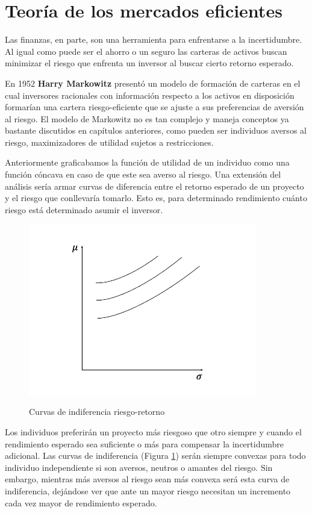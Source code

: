 \section{Teoría de los mercados eficientes}
Las finanzas, en parte, son una herramienta para enfrentarse a la incertidumbre. Al igual como puede ser el ahorro o un seguro las carteras de activos buscan minimizar el riesgo que enfrenta un inversor al buscar cierto retorno esperado. 

En 1952 \textbf{Harry Markowitz} presentó un modelo de formación de carteras en el cual inversores racionales con información respecto a los activos en disposición formarían una cartera riesgo-eficiente que se ajuste a sus preferencias de aversión al riesgo. El modelo de Markowitz no es tan complejo y maneja conceptos ya bastante discutidos en capítulos anteriores, como pueden ser individuos aversos al riesgo, maximizadores de utilidad sujetos a restricciones.

Anteriormente graficabamos la función de utilidad de un individuo como una función cóncava en caso de que este sea averso al riesgo. Una extensión del análisis sería armar curvas de diferencia entre el retorno esperado de un proyecto y el riesgo que conllevaría tomarlo. Esto es, para determinado rendimiento cuánto riesgo está determinado asumir el inversor. 
\begin{figure}[ht]
    \centering
    \caption{Curvas de indiferencia riesgo-retorno}
    \includegraphics[width=10cm]{Figuras/Curvas de indiferencia riesgo-retorno.jpeg}
    \label{fig: Curvas de indiferencia riesgo-retorno}
\end{figure}
Los individuos preferirán un proyecto más riesgoso que otro siempre y cuando el rendimiento esperado sea suficiente o más para compensar la incertidumbre adicional. Las curvas de indiferencia (Figura \ref{fig: Curvas de indiferencia riesgo-retorno}) serán siempre convexas para todo individuo independiente si son aversos, neutros o amantes del riesgo. Sin embargo, mientras más aversos al riesgo sean más convexa será esta curva de indiferencia, dejándose ver que ante un mayor riesgo necesitan un incremento cada vez mayor de rendimiento esperado.

